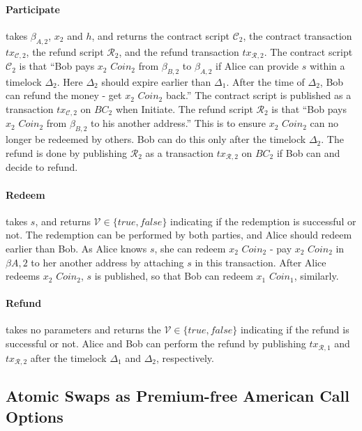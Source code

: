 \paragraph{Participate}
takes $\beta_{A, 2}$, $x_2$ and $h$,
and returns the contract script $\mathcal{C}_2$, the contract transaction $tx_{\mathcal{C}, 2}$, the refund script $\mathcal{R}_2$, and the refund transaction $tx_{\mathcal{R}, 2}$.
The contract script $\mathcal{C}_2$ is that ``Bob pays $x_2$ $Coin_2$ from $\beta_{B, 2}$ to $\beta_{A, 2}$ if Alice can provide $s$ within a timelock $\Delta_2$. Here $\Delta_2$ should expire earlier than $\Delta_1$. After the time of $\Delta_2$, Bob can refund the money - get $x_2$ $Coin_2$ back.''
The contract script is published as a transaction $tx_{\mathcal{C}, 2}$ on $BC_2$ when Initiate.
The refund script $\mathcal{R}_2$ is that ``Bob pays $x_2$ $Coin_2$ from $\beta_{B, 2}$ to his another address.'' This is to ensure $x_2$ $Coin_2$ can no longer be redeemed by others. Bob can do this only after the timelock $\Delta_2$.
The refund is done by publishing $\mathcal{R}_2$ as a transaction $tx_{\mathcal{R}, 2}$ on $BC_2$ if Bob can and decide to refund.

\paragraph{Redeem}
takes $s$,
and returns $\mathcal{V} \in \{true, false\}$ indicating if the redemption is successful or not.
The redemption can be performed by both parties, and Alice should redeem earlier than Bob.
As Alice knows $s$, she can redeem $x_2$ $Coin_2$ - pay $x_2$ $Coin_2$ in $\beta{A, 2}$ to her another address by attaching $s$ in this transaction.
After Alice redeems $x_2$ $Coin_2$, $s$ is published, so that Bob can redeem $x_1$ $Coin_1$, similarly.

\paragraph{Refund}
takes no parameters and returns the $\mathcal{V} \in \{true, false\}$ indicating if the refund is successful or not.
Alice and Bob can perform the refund by publishing $tx_{\mathcal{R}, 1}$ and $tx_{\mathcal{R}, 2}$ after the timelock $\Delta_1$ and $\Delta
_2$, respectively.



\subsection{Atomic Swaps as Premium-free American Call Options}

